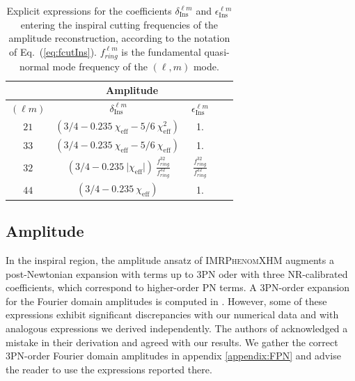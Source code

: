 \documentclass[twocolumn,prd,aps,superscriptaddress,preprintnumbers,tightenlines,showpacs,nofootinbib,eqsecnum,amsfonts,amsmath]{revtex4}
\newcommand{\phXHM}{\textsc{IMRPhenomXHM}\xspace}
\begin{document}
\begin{table}[h!]
\caption{Explicit expressions for the coefficients $\delta^{\ell m}_{\mathrm{Ins}}$ and $\epsilon^{\ell m}_{\mathrm{Ins}}$ entering the inspiral cutting frequencies of the amplitude reconstruction, according to the notation of Eq.~(\ref{eq:fcutIns}). $f^{\ell m}_{ring}$ is the fundamental quasi-normal mode frequency of the $(\ell,m)$ mode.}
\label{tab:deltaInsp}
\begin{center}
{\renewcommand{\arraystretch}{1.5}
\begin{tabular}{| c || c | c | c | c |}
\hline
 &\multicolumn{2}{c|}{Amplitude} \\
\hline
$(\ell m)$      & $\delta_{\mathrm{Ins}}^{\ell m} $    & $\epsilon_{\mathrm{Ins}}^{\ell m}$  \\   
\hline                        
$21$     & $ \left(3/4-0.235 \:\chi_{\mathrm{eff}} - 5/6 \:\chi_{\mathrm{eff}}^2 \right) \:$  & 1. \\
\hline
$33$ & $ \left(3/4-0.235 \:\chi_{\mathrm{eff}} - 5/6 \:\chi_{\mathrm{eff}} \right) \:$ & 1.  \\
\hline
$32$ & $ \left(3/4-0.235 \:\vert\chi_{\mathrm{eff}}\vert  \right) \:  \frac{f^{32}_{ring}}{f^{32}_{ring}}$ & $\frac{f^{32}_{ring}}{f^{22}_{ring}}$ \\
\hline
$44$ & $ \left(3/4-0.235 \:\chi_{\mathrm{eff}} \right) \: $ & 1. \\
\hline
\end{tabular}
}
\end{center}
\end{table}




\subsection{Amplitude} \label{sec:ins_amp}

In the inspiral region, the amplitude ansatz of \phXHM augments a post-Newtonian expansion 
with terms up to 3PN oder with three NR-calibrated coefficients, 
which correspond to higher-order PN terms. 
%
A 3PN-order expansion for the Fourier domain amplitudes is computed in \cite{PNamps}. 
However, some of these expressions exhibit significant discrepancies with our numerical data and with analogous expressions we derived independently. The authors of \cite{PNamps} acknowledged a mistake in their derivation and agreed with our results. We gather the correct 3PN-order Fourier domain amplitudes in appendix \ref{appendix:FPN} and advise the reader to use the expressions reported there.
\end{document}
